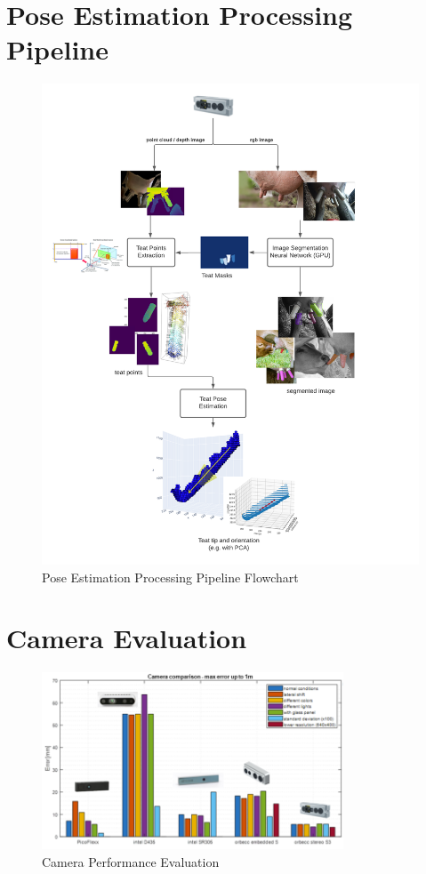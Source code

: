 \newpage
\section{Pose Estimation Processing Pipeline}
\label{appendix:cow_design}
\begin{figure}[!ht]
    \centering
    \includegraphics[width=1\textwidth]{images/cow_design.png}
    \caption{Pose Estimation Processing Pipeline Flowchart}
    \label{fig:cow_design}
\end{figure}

\newpage
\section{Camera Evaluation}
\label{appendix:camera_evaluation}

\begin{figure}[h]
        \centering
        \includegraphics[width=0.8\textwidth]{images/camera_choice.png}
        \caption{Camera Performance Evaluation}
        \label{fig:camera_choice}
    \end{figure}
  
